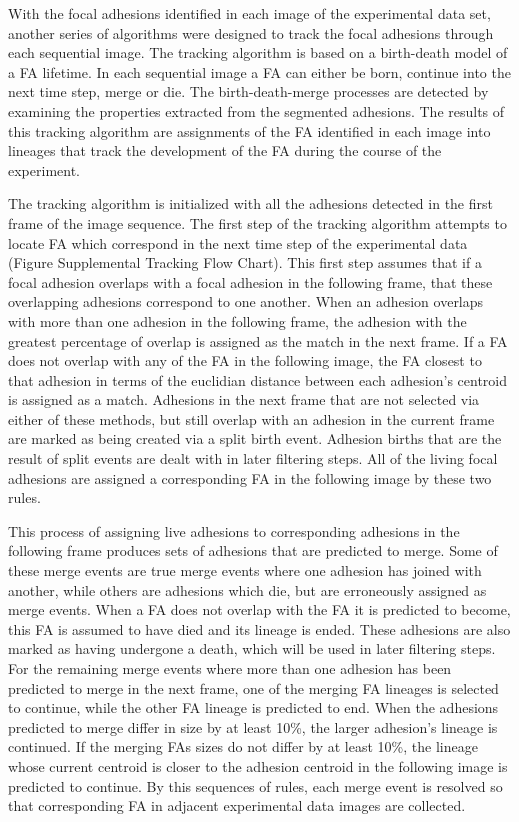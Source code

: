 \documentclass[10pt,draft]{article}
\begin{document}
With the focal adhesions identified in each image of the experimental data set, another series of algorithms were designed to track the focal adhesions through each sequential image. The tracking algorithm is based on a birth-death model of a FA lifetime. In each sequential image a FA can either be born, continue into the next time step, merge or die. The birth-death-merge processes are detected by examining the properties extracted from the segmented adhesions. The results of this tracking algorithm are assignments of the FA identified in each image into lineages that track the development of the FA during the course of the experiment.

The tracking algorithm is initialized with all the adhesions detected in the first frame of the image sequence. The first step of the tracking algorithm attempts to locate FA which correspond in the next time step of the experimental data (Figure Supplemental Tracking Flow Chart). This first step assumes that if a focal adhesion overlaps with a focal adhesion in the following frame, that these overlapping adhesions correspond to one another. When an adhesion overlaps with more than one adhesion in the following frame, the adhesion with the greatest percentage of overlap is assigned as the match in the next frame. If a FA does not overlap with any of the FA in the following image, the FA closest to that adhesion in terms of the euclidian distance between each adhesion's centroid is assigned as a match. Adhesions in the next frame that are not selected via either of these methods, but still overlap with an adhesion in the current frame are marked as being created via a split birth event. Adhesion births that are the result of split events are dealt with in later filtering steps. All of the living focal adhesions are assigned a corresponding FA in the following image by these two rules.

This process of assigning live adhesions to corresponding adhesions in the following frame produces sets of adhesions that are predicted to merge. Some of these merge events are true merge events where one adhesion has joined with another, while others are adhesions which die, but are erroneously assigned as merge events. When a FA does not overlap with the FA it is predicted to become, this FA is assumed to have died and its lineage is ended. These adhesions are also marked as having undergone a death, which will be used in later filtering steps. For the remaining merge events where more than one adhesion has been predicted to merge in the next frame, one of the merging FA lineages is selected to continue, while the other FA lineage is predicted to end. When the adhesions predicted to merge differ in size by at least 10\%, the larger adhesion's lineage is continued. If the merging FAs sizes do not differ by at least 10\%, the lineage whose current centroid is closer to the adhesion centroid in the following image is predicted to continue. By this sequences of rules, each merge event is resolved so that corresponding FA in adjacent experimental data images are collected.
\end{document}
